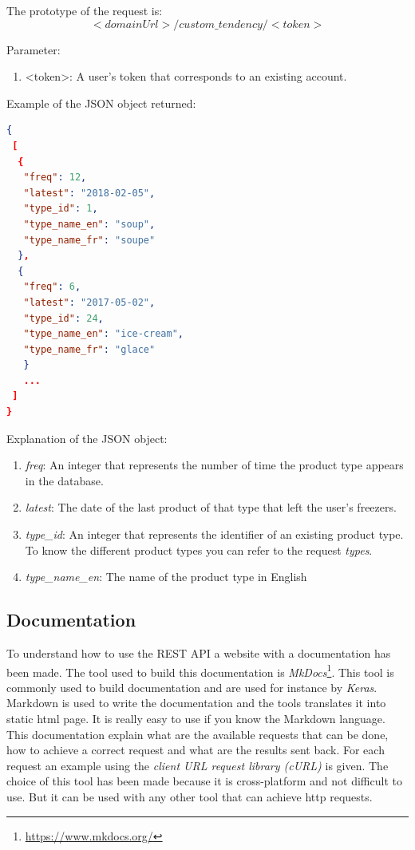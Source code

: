 The prototype of the request is:
$$<domainUrl>/custom\_tendency/<token>$$

Parameter:
\begin{enumerate}
\item <token>: A user's token that corresponds to an existing account.
\end{enumerate}

Example of the JSON object returned:
\begin{lstlisting}[language=json]
{
 [
  {
   "freq": 12, 
   "latest": "2018-02-05", 
   "type_id": 1, 
   "type_name_en": "soup", 
   "type_name_fr": "soupe"
  }, 
  {
   "freq": 6, 
   "latest": "2017-05-02", 
   "type_id": 24, 
   "type_name_en": "ice-cream", 
   "type_name_fr": "glace"
   }
   ...
 ]
}
\end{lstlisting}

Explanation of the  JSON object:
\begin{enumerate}
\item \textit{freq}: An integer that represents the number of time the product type appears in the database.
\item \textit{latest}: The date of the last product of that type that left the user's freezers.
\item \textit{type\_id}: An integer that represents the identifier of an existing product type. To know the different product types you can refer to the request \textit{types}.
\item \textit{type\_name\_en}: The name of the product type in English
\end{enumerate}

\subsection{Documentation}
To understand how to use the REST API a website with a documentation has been made. The tool used to build this documentation is \textit{MkDocs}\footnote{\url{https://www.mkdocs.org/}}. This tool is commonly used to build documentation and are used for instance by \textit{Keras}. Markdown is used to write the documentation and the tools translates it into static html page. It is really easy to use if you know the Markdown language. \\

This documentation explain what are the available requests that can be done, how to achieve a correct request and what are the results sent back.
For each request an example using the \textit{client URL request library (cURL)} is given. The choice of this tool has been made because  it is cross-platform and not difficult to use. But it can be used with any other tool that can achieve http requests.

